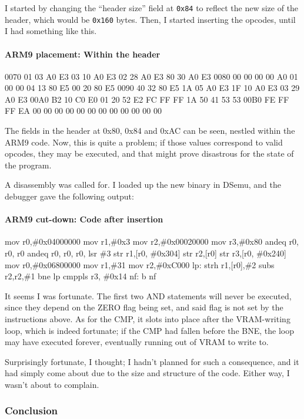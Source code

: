 \documentclass[11pt,a4paper]{article}
\let\oldparagraph\paragraph
\renewcommand{\paragraph}[1]{\oldparagraph{#1}\mbox{}}
\begin{document}
I started by changing the ``header size'' field at \texttt{0x84} to
reflect the new size of the header, which would be \texttt{0x160} bytes.
Then, I started inserting the opcodes, until I had something like this.

\paragraph{ARM9 placement: Within the
header}\label{arm9-placement-within-the-header}

0070 01 03 A0 E3 03 10 A0 E3 02 28 A0 E3 80 30 A0 E3 0080 00 00 00 00 A0
01 00 00 04 13 80 E5 00 20 80 E5 0090 40 32 80 E5 1A 05 A0 E3 1F 10 A0
E3 03 29 A0 E3 00A0 B2 10 C0 E0 01 20 52 E2 FC FF FF 1A 50 41 53 53 00B0
FE FF FF EA 00 00 00 00 00 00 00 00 00 00 00 00

The fields in the header at 0x80, 0x84 and 0xAC can be seen, nestled
within the ARM9 code. Now, this is quite a problem; if those values
correspond to valid opcodes, they may be executed, and that might prove
disastrous for the state of the program.

A disassembly was called for. I loaded up the new binary in DSemu, and
the debugger gave the following output:

\paragraph{ARM9 cut-down: Code after
insertion}\label{arm9-cut-down-code-after-insertion}

mov r0,\#0x04000000 mov r1,\#0x3 mov r2,\#0x00020000 mov r3,\#0x80
{andeq r0, r0, r0} {andeq r0, r0, r0, lsr \#3} str r1,{[}r0, \#0x304{]}
str r2,{[}r0{]} str r3,{[}r0, \#0x240{]} mov r0,\#0x06800000 mov r1,\#31
mov r2,\#0xC000 lp: strh r1,{[}r0{]},\#2 subs r2,r2,\#1 bne lp {cmppls
r3, \#0x14} nf: b nf

It seems I was fortunate. The first two AND statements will never be
executed, since they depend on the ZERO flag being set, and said flag is
not set by the instructions above. As for the CMP, it slots into place
after the VRAM-writing loop, which is indeed fortunate; if the CMP had
fallen before the BNE, the loop may have executed forever, eventually
running out of VRAM to write to.

Surprisingly fortunate, I thought; I hadn't planned for such a
consequence, and it had simply come about due to the size and structure
of the code. Either way, I wasn't about to complain.

\subsubsection{Conclusion}\label{conclusion}
\end{document}

